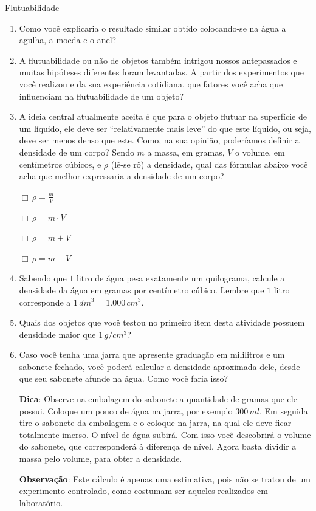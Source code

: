 \begin{task}{Flutuabilidade}
\begin{enumerate}
\item {} 
Como você explicaria o resultado similar obtido colocando-se na água a agulha, a moeda e o anel?

\item {} 
A flutuabilidade ou não de objetos também intrigou nossos antepassados e muitas hipóteses diferentes foram levantadas. A partir dos experimentos que você realizou e da sua experiência cotidiana,  que fatores você acha que influenciam na flutuabilidade de um objeto?

\item {} 
A ideia central atualmente aceita é que para o objeto flutuar na superfície de um líquido, ele deve ser “relativamente mais leve” do que este líquido, ou seja, deve ser menos denso que este. Como, na sua opinião, poderíamos definir a densidade de um corpo? Sendo $m$ a massa, em gramas, $V$ o volume, em centímetros cúbicos, e  $\rho$  (lê-se rô) a densidade, qual das fórmulas abaixo você acha que melhor expressaria a densidade de um corpo?

$\Box \, \rho = \displaystyle\frac{m}{V}$

$\Box \, \rho = m \cdot V$

$\Box \, \rho = m + V$

$\Box \, \rho = m - V$

\item {} 
Sabendo que $1$ litro de água pesa exatamente um quilograma, calcule a densidade da água em gramas por centímetro cúbico.  Lembre que $1$ litro corresponde a $1\,dm^3=1.000\,cm^3$.

\item {} 
Quais dos objetos que você testou no primeiro item desta atividade possuem densidade maior que $1 \,g/cm^3$?

\item {} 
Caso você tenha uma jarra que apresente graduação em mililitros e um sabonete fechado, você poderá calcular a densidade aproximada dele, desde que seu sabonete afunde na água.  Como você faria isso?

\textbf{Dica}: Observe na embalagem do sabonete a quantidade de gramas que ele possui. Coloque um pouco de água na jarra, por exemplo $300\, ml$. Em seguida tire o sabonete da embalagem e o coloque na jarra, na qual ele deve ficar totalmente imerso. O nível de água subirá. Com isso você descobrirá o volume do sabonete, que corresponderá à diferença de nível. Agora basta dividir a massa pelo volume, para obter a densidade.

\textbf{Observação}: Este cálculo é apenas uma estimativa, pois não se tratou de um experimento controlado, como costumam ser aqueles realizados em laboratório.

\end{enumerate}
\end{task}





